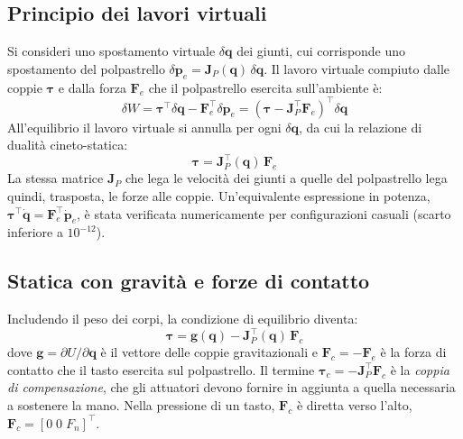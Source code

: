 \subsection{Principio dei lavori virtuali}

Si consideri uno spostamento virtuale $\delta\boldsymbol q$ dei giunti, cui corrisponde uno spostamento del polpastrello $\delta\boldsymbol p_e=\boldsymbol J_P(\boldsymbol q)\,\delta\boldsymbol q$. Il lavoro virtuale compiuto dalle coppie $\boldsymbol\tau$ e dalla forza $\boldsymbol F_e$ che il polpastrello esercita sull'ambiente è:
\begin{equation}
    \delta W=\boldsymbol\tau^\top\delta\boldsymbol q-\boldsymbol F_e^\top\delta\boldsymbol p_e
    =\left(\boldsymbol\tau-\boldsymbol J_P^\top\boldsymbol F_e\right)^\top\delta\boldsymbol q
\end{equation}
All'equilibrio il lavoro virtuale si annulla per ogni $\delta\boldsymbol q$, da cui la relazione di dualità cineto-statica:
\begin{equation}
    \boldsymbol\tau=\boldsymbol J_P^\top(\boldsymbol q)\,\boldsymbol F_e
    \label{eq:duality}
\end{equation}
La stessa matrice $\boldsymbol J_P$ che lega le velocità dei giunti a quelle del polpastrello lega quindi, trasposta, le forze alle coppie. Un'equivalente espressione in potenza, $\boldsymbol\tau^\top\dot{\boldsymbol q}=\boldsymbol F_e^\top\dot{\boldsymbol p}_e$, è stata verificata numericamente per configurazioni casuali (scarto inferiore a $10^{-12}$).

\subsection{Statica con gravità e forze di contatto}

Includendo il peso dei corpi, la condizione di equilibrio diventa:
\begin{equation}
    \boldsymbol\tau=\boldsymbol g(\boldsymbol q)-\boldsymbol J_P^\top(\boldsymbol q)\,\boldsymbol F_c
    \label{eq:statics_gravity}
\end{equation}
dove $\boldsymbol g=\partial U/\partial\boldsymbol q$ è il vettore delle coppie gravitazionali e $\boldsymbol F_c=-\boldsymbol F_e$ è la forza di contatto che il tasto esercita sul polpastrello. Il termine $\boldsymbol\tau_c=-\boldsymbol J_P^\top\boldsymbol F_c$ è la \emph{coppia di compensazione}, che gli attuatori devono fornire in aggiunta a quella necessaria a sostenere la mano. Nella pressione di un tasto, $\boldsymbol F_c$ è diretta verso l'alto, $\boldsymbol F_c=[0\;0\;F_n]^\top$.

